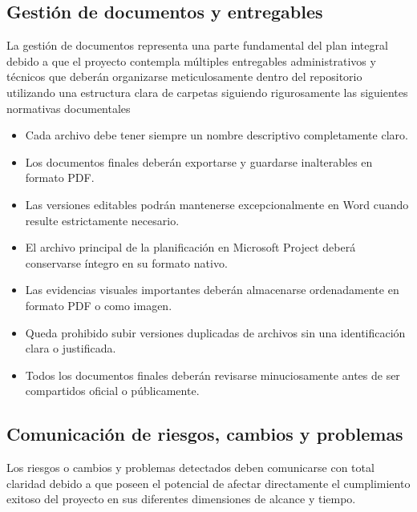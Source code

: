 \documentclass[11pt,spanish]{article}
\begin{document}
\subsection{Gestión de documentos y entregables}

La gestión de documentos representa una parte fundamental del plan integral debido a que el proyecto contempla múltiples entregables administrativos y técnicos que deberán organizarse meticulosamente dentro del repositorio utilizando una estructura clara de carpetas siguiendo rigurosamente las siguientes normativas documentales

\begin{itemize}
    \item Cada archivo debe tener siempre un nombre descriptivo completamente claro.
    \item Los documentos finales deberán exportarse y guardarse inalterables en formato PDF.
    \item Las versiones editables podrán mantenerse excepcionalmente en Word cuando resulte estrictamente necesario.
    \item El archivo principal de la planificación en Microsoft Project deberá conservarse íntegro en su formato nativo.
    \item Las evidencias visuales importantes deberán almacenarse ordenadamente en formato PDF o como imagen.
    \item Queda prohibido subir versiones duplicadas de archivos sin una identificación clara o justificada.
    \item Todos los documentos finales deberán revisarse minuciosamente antes de ser compartidos oficial o públicamente.
\end{itemize}

\subsection{Comunicación de riesgos, cambios y problemas}

Los riesgos o cambios y problemas detectados deben comunicarse con total claridad debido a que poseen el potencial de afectar directamente el cumplimiento exitoso del proyecto en sus diferentes dimensiones de alcance y tiempo.
\end{document}
